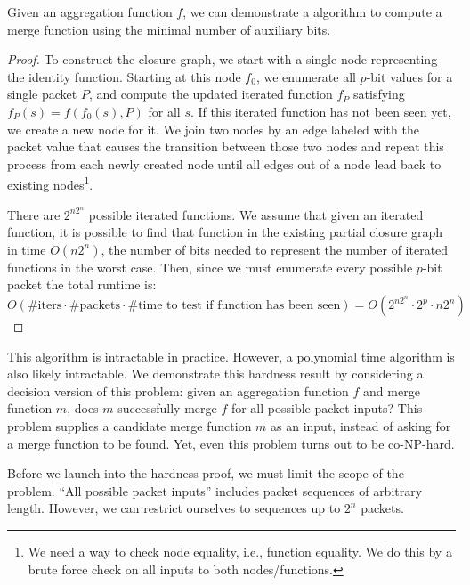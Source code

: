 \begin{theorem}
Given an aggregation function $f$, we can demonstrate a algorithm to compute a merge function using the minimal number of auxiliary bits.
\end{theorem}
\begin{proof}
To construct the closure graph, we start with a single node representing the
identity function. Starting at this node $f_0$, we enumerate all $p$-bit values for a
single packet $P$, and compute the updated iterated function $f_P$ satisfying $f_P(s) = f(f_0(s), P)$ for all $s$.
If this iterated function has not been seen yet, we create a new node for it.
We join two nodes by an edge labeled
with the packet value that causes the transition between those two nodes and
repeat this process from each newly created node until all edges out of a node
lead back to existing nodes\footnote{We need a way to check node equality,
i.e., function equality. We do this by a brute force check on all inputs to
both nodes/functions.}.

There are $2^{n2^n}$ possible iterated functions. We assume that given an iterated function,
it is possible to find that function in the existing partial closure graph in time $O(n2^n)$,
the number of bits needed to represent the number of iterated functions in the worst case.
Then, since we must enumerate every possible $p$-bit packet the total runtime is:
\[ O(\text{\# iters} \cdot \text{\# packets} \cdot \text{\# time to test if function has been seen}) =  O\left(2^{n2^n} \cdot 2^p \cdot n2^n\right) \]
\end{proof}

This algorithm is intractable in practice. However, a polynomial time algorithm is also likely intractable.
We demonstrate this hardness result by considering a decision version of this problem:
given an aggregation function $f$ and merge function $m$, does $m$ successfully merge $f$ for all possible packet inputs?
This problem supplies a candidate merge function $m$ as an input, instead of asking for a merge function to be found.
Yet, even this problem turns out to be co-NP-hard.

Before we launch into the hardness proof, we must limit the scope of the problem. ``All possible packet inputs'' includes
packet sequences of arbitrary length. However, we can restrict ourselves to sequences up to $2^n$ packets.

